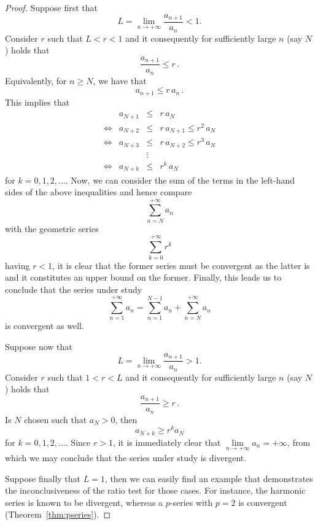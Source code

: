 \begin{proof}
Suppose first that 
$$\displaystyle L=\lim _{n\to+\infty }{\frac {a_{n+1}}{a_{n}}}<1.$$ Consider $r$ such that $L<r<1$ and it consequently for sufficiently large $n$ (say $N$) holds that 
$$
\dfrac{a_{n+1}}{a_n}\leq r\,.
$$
Equivalently, for $n\geq N$, we have that 
$$
a_{n+1}\leq r\,a_n\,.
$$
This implies that
$$ 
\begin{array}{rrcl}
&a_{N+1}&\leq&r\,a_N\\
\Leftrightarrow&a_{N+2}&\leq& r\,a_{N+1}\leq r^2\,a_N\\
\Leftrightarrow&a_{N+3}&\leq& r\,a_{N+2}\leq r^3\,a_N\\
&&\vdots&\\
\Leftrightarrow&a_{N+k}&\leq&r^k\,a_N
\end{array}
$$
for $k=0,1,2,\ldots$. Now, we can consider the sum of the terms in the left-hand sides of the above inequalities and hence compare 
$$
\sum\limits_{n=N}^{+\infty}a_n
$$
with the geometric series
$$
\sum\limits_{k=0}^{+\infty}r^k
$$
having $r<1$, it is clear that the former series must be convergent as the latter is and it constitutes an upper bound on the former. Finally, this leads us to conclude that the series under study
$$
\sum\limits_{n=1}^{+\infty}a_n=\sum\limits_{n=1}^{N-1}a_n+\sum\limits_{n=N}^{+\infty}a_n
$$
is convergent as well. 

Suppose now that 
$$\displaystyle L=\lim _{n\to+\infty }{\frac {a_{n+1}}{a_{n}}}>1.$$ Consider $r$ such that $1<r<L$ and it consequently for sufficiently large $n$ (say $N$) holds that 
$$
\dfrac{a_{n+1}}{a_n}\geq r\,.
$$
Is $N$ chosen such that $a_N>0$, then
$$
a_{N+k}\geq r^ka_N
$$
for $k=0,1,2,\ldots$. Since $r>1$, it is immediately clear that $\lim\limits_{n\to+\infty}a_n=+\infty$, from which we may conclude that the series under study is divergent. 

Suppose finally that $L=1$, then we can easily find an example that demonstrates the inconclusiveness of the ratio test for those cases. For instance, the harmonic series is known to be divergent, whereas a $p$-series with $p=2$ is convergent (Theorem~\ref{thm:pseries}).
\end{proof}

%
%


